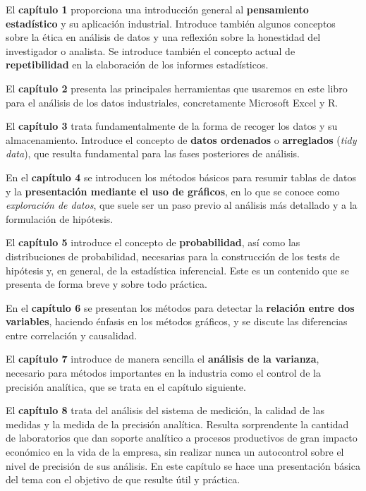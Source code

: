 \documentclass[
  letterpaper,
  DIV=11,
  numbers=noendperiod,
  oneside]{scrreprt}
\begin{document}

El \textbf{capítulo 1} proporciona una introducción general al
\textbf{pensamiento estadístico} y su aplicación industrial. Introduce
también algunos conceptos sobre la ética en análisis de datos y una
reflexión sobre la honestidad del investigador o analista. Se introduce
también el concepto actual de \textbf{repetibilidad} en la elaboración
de los informes estadísticos.

El \textbf{capítulo 2} presenta las principales herramientas que
usaremos en este libro para el análisis de los datos industriales,
concretamente Microsoft Excel y R.

El \textbf{capítulo 3} trata fundamentalmente de la forma de recoger los
datos y su almacenamiento. Introduce el concepto de \textbf{datos
ordenados} o \textbf{arreglados} (\emph{tidy data}), que resulta
fundamental para las fases posteriores de análisis.

En el \textbf{capítulo 4} se introducen los métodos básicos para resumir
tablas de datos y la \textbf{presentación mediante el uso de gráficos},
en lo que se conoce como \emph{exploración de datos}, que suele ser un
paso previo al análisis más detallado y a la formulación de hipótesis.

El \textbf{capítulo 5} introduce el concepto de \textbf{probabilidad},
así como las distribuciones de probabilidad, necesarias para la
construcción de los tests de hipótesis y, en general, de la estadística
inferencial. Este es un contenido que se presenta de forma breve y sobre
todo práctica.

En el \textbf{capítulo 6} se presentan los métodos para detectar la
\textbf{relación entre dos variables}, haciendo énfasis en los métodos
gráficos, y se discute las diferencias entre correlación y causalidad.

El \textbf{capítulo 7} introduce de manera sencilla el \textbf{análisis
de la varianza}, necesario para métodos importantes en la industria como
el control de la precisión analítica, que se trata en el capítulo
siguiente.

El \textbf{capítulo 8} trata del análisis del sistema de medición, la
calidad de las medidas y la medida de la precisión analítica. Resulta
sorprendente la cantidad de laboratorios que dan soporte analítico a
procesos productivos de gran impacto económico en la vida de la empresa,
sin realizar nunca un autocontrol sobre el nivel de precisión de sus
análisis. En este capítulo se hace una presentación básica del tema con
el objetivo de que resulte útil y práctica.
\end{document}
